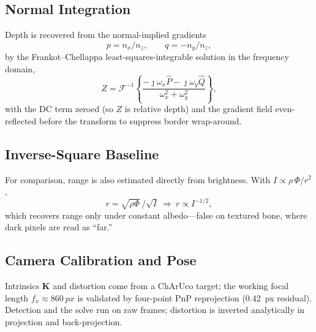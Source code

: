 \documentclass[journal]{IEEEtran}
\newcommand{\K}{\bm{K}}
\begin{document}
\subsection{Normal Integration}\label{sub:integrate}
Depth is recovered from the normal-implied gradients
\begin{equation}
p=n_x/n_z,\qquad q=-n_y/n_z,
\label{eq:pq}
\end{equation}
by the Frankot--Chellappa least-squares-integrable solution in the frequency domain,
\begin{equation}
Z=\mathcal{F}^{-1}\!\left\{\frac{-\jmath\omega_x\hat P-\jmath\omega_y\hat Q}
{\omega_x^2+\omega_y^2}\right\},
\label{eq:fc}
\end{equation}
with the DC term zeroed (so $Z$ is relative depth) and the gradient field
even-reflected before the transform to suppress border wrap-around.

\subsection{Inverse-Square Baseline}\label{sub:invsq}
For comparison, range is also estimated directly from brightness. With
$I\propto\rho\,\Phi/r^2$,
\begin{equation}
r=\sqrt{\rho\Phi}\,/\sqrt{I}\ \Longrightarrow\ r\propto I^{-1/2},
\label{eq:invsq}
\end{equation}
which recovers range only under constant albedo---false on textured bone, where dark
pixels are read as ``far.''

\subsection{Camera Calibration and Pose}\label{sub:calib}
Intrinsics $\K$ and distortion come from a ChArUco target; the working focal length
$f_x\approx\SI{860}{px}$ is validated by four-point PnP reprojection
(\SI{0.42}{px} residual). Detection and the solve run on raw frames; distortion is
inverted analytically in projection and back-projection.
\end{document}
